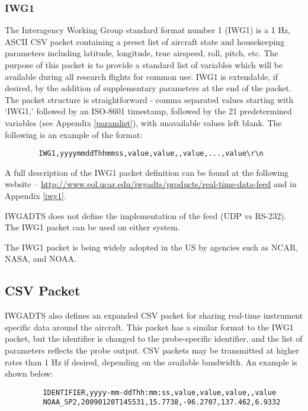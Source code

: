 \subsubsection{IWG1}
The Interagency Working Group standard format number 1 (IWG1) is a 1 Hz, ASCII CSV packet containing a preset list of aircraft state and housekeeping parameters including latitude, longitude, true airspeed, roll, pitch, etc.  The purpose of this packet is to provide a standard list of variables which will be available during all research flights for common use.  IWG1 is extendable, if desired, by the addition of supplementary parameters at the end of the packet.  The packet structure is straightforward - comma separated values starting with `IWG1,' followed by an ISO-8601 timestamp, followed by the 21 predetermined variables (see Appendix \ref{paramlist}), with unavailable values left blank.  The following is an example of the format:

	\begin{verbatim}
		IWG1,yyyymmddThhmmss,value,value,,value,...,value\r\n
	\end{verbatim}


A full description of the IWG1 packet definition can be found at the following website -- \href{http://www.eol.ucar.edu/iwgadts/products/real-time-data-feed}{http://www.eol.ucar.edu/iwgadts/products/real-time-data-feed} and in Appendix \ref{iwg1}.

IWGADTS does not define the implementation of the feed (UDP vs RS-232).  The IWG1 packet can be used on either system.

The IWG1 packet is being widely adopted in the US by agencies such as NCAR, NASA, and NOAA.  


\subsection{CSV Packet}\label{csvpkt}
%
IWGADTS also defines an expanded CSV packet for sharing real-time instrument specific data around the aircraft.  This packet has a similar format to the IWG1 packet, but the identifier is changed to the probe-specific identifier, and the list of parameters reflects the probe output.  CSV packets may be transmitted at higher rates than 1 Hz if desired, depending on the available bandwidth.  An example is shown below:

	\begin{verbatim}
		 IDENTIFIER,yyyy-mm-ddThh:mm:ss,value,value,value,,value
		 NOAA_SP2,20090120T145531,15.7738,-96.2707,137.462,6.9332
	\end{verbatim}


